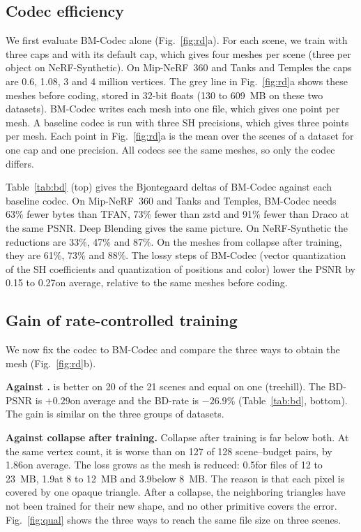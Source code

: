 \subsection{Codec efficiency}
\label{sec:codec}
We first evaluate BM-Codec alone (Fig.~\ref{fig:rd}a). For each scene, we train \MSc with three caps and \MS with its default cap, which gives four meshes per scene (three per object on NeRF-Synthetic). On Mip-NeRF~360 and Tanks and Temples the caps are 0.6, 1.08, 3 and 4 million vertices. The grey line in Fig.~\ref{fig:rd}a shows these meshes before coding, stored in 32-bit floats (130 to 609~MB on these two datasets). BM-Codec writes each mesh into one file, which gives one point per mesh. A baseline codec is run with three SH precisions, which gives three points per mesh. Each point in Fig.~\ref{fig:rd}a is the mean over the scenes of a dataset for one cap and one precision. All codecs see the same meshes, so only the codec differs.

Table~\ref{tab:bd} (top) gives the Bjontegaard deltas of BM-Codec against each baseline codec. On Mip-NeRF~360 and Tanks and Temples, BM-Codec needs 63\% fewer bytes than TFAN, 73\% fewer than zstd and 91\% fewer than Draco at the same PSNR. Deep Blending gives the same picture. On NeRF-Synthetic the reductions are 33\%, 47\% and 87\%. On the meshes from collapse after training, they are 61\%, 73\% and 88\%. The lossy steps of BM-Codec (vector quantization of the SH coefficients and quantization of positions and color) lower the PSNR by 0.15 to 0.27\dB on average, relative to the same meshes before coding.

\subsection{Gain of rate-controlled training}
\label{sec:rd}
We now fix the codec to BM-Codec and compare the three ways to obtain the mesh (Fig.~\ref{fig:rd}b).

\noindent\textbf{Against \MSc.} \BM is better on 20 of the 21 scenes and equal on one (treehill). The BD-PSNR is $+0.29$\dB on average and the BD-rate is $-26.9\%$ (Table~\ref{tab:bd}, bottom). The gain is similar on the three groups of datasets.

\noindent\textbf{Against collapse after training.} Collapse after training is far below both. At the same vertex count, it is worse than \MSc on 127 of 128 scene--budget pairs, by 1.86\dB on average. The loss grows as the mesh is reduced: 0.5\dB for files of 12 to 23~MB, 1.9\dB at 8 to 12~MB and 3.9\dB below 8~MB. The reason is that each pixel is covered by one opaque triangle. After a collapse, the neighboring triangles have not been trained for their new shape, and no other primitive covers the error. Fig.~\ref{fig:qual} shows the three ways to reach the same file size on three scenes.

